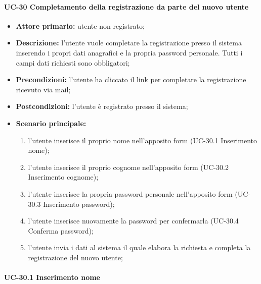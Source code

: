 
\paragraph{UC-30 Completamento della registrazione da parte del nuovo utente}

	\begin{itemize}
		\item \textbf{Attore primario:} utente non registrato;

		\item \textbf{Descrizione:} l'utente vuole completare la registrazione presso il sistema inserendo i propri dati anagrafici e la propria password personale. Tutti i campi dati richiesti sono obbligatori;

		\item \textbf{Precondizioni:} l'utente ha cliccato il link per completare la registrazione ricevuto via mail;

		\item \textbf{Postcondizioni:} l'utente è registrato presso il sistema;

		\item \textbf{Scenario principale:}
	      \begin{enumerate}
		      \item l'utente inserisce il proprio nome nell'apposito form (UC-30.1 Inserimento nome);
		      \item l'utente inserisce il proprio cognome nell'apposito form (UC-30.2 Inserimento cognome);
		      \item l'utente inserisce la propria password personale nell'apposito form (UC-30.3 Inserimento password);
		      \item l'utente inserisce nuovamente la password per confermarla (UC-30.4 Conferma password);
		      \item l'utente invia i dati al sistema il quale elabora la richiesta e completa la registrazione del nuovo utente;
	      \end{enumerate}
	\end{itemize}


\paragraph{UC-30.1 Inserimento nome}

